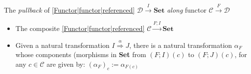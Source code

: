 
The \emph{pullback} of \ref{Functor|functor|referenced} $\mathcal{D}\xrightarrow{I}\mathbf{Set}$ \emph{along} functor $\mathcal{C}\xrightarrow{F}\mathcal{D}$

\begin{itemize}
    \item  The composite \ref{Functor|functor|referenced} $\mathcal{C}\xrightarrow{F;I}\mathbf{Set}$
    \item Given a natural transformation $I \overset{\alpha}\Rightarrow J$, there is a natural transformation $\alpha_F$ whose components (morphisms in \textbf{Set} from $(F;I)(c)$ to $(F;J)(c)$, for any $c \in \mathcal{C}$ are given by: $(\alpha_F)_c := \alpha_{F(c)}$

  \end{itemize}
